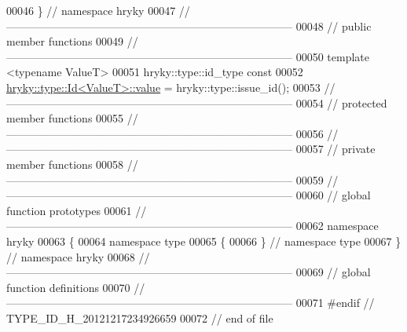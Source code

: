 \begin{DoxyCode}
00046 \} \textcolor{comment}{// namespace hryky}
00047 \textcolor{comment}{//
      ------------------------------------------------------------------------------}
00048 \textcolor{comment}{// public member functions}
00049 \textcolor{comment}{//
      ------------------------------------------------------------------------------}
00050 \textcolor{keyword}{template} <\textcolor{keyword}{typename} ValueT>
00051 hryky::type::id\_type \textcolor{keyword}{const}
00052 \hyperlink{classhryky_1_1type_1_1_id}{hryky::type::Id<ValueT>::value} = hryky::type::issue\_id();
00053 \textcolor{comment}{//
      ------------------------------------------------------------------------------}
00054 \textcolor{comment}{// protected member functions}
00055 \textcolor{comment}{//
      ------------------------------------------------------------------------------}
00056 \textcolor{comment}{//
      ------------------------------------------------------------------------------}
00057 \textcolor{comment}{// private member functions}
00058 \textcolor{comment}{//
      ------------------------------------------------------------------------------}
00059 \textcolor{comment}{//
      ------------------------------------------------------------------------------}
00060 \textcolor{comment}{// global function prototypes}
00061 \textcolor{comment}{//
      ------------------------------------------------------------------------------}
00062 \textcolor{keyword}{namespace }hryky
00063 \{
00064 \textcolor{keyword}{namespace }type
00065 \{
00066 \} \textcolor{comment}{// namespace type}
00067 \} \textcolor{comment}{// namespace hryky}
00068 \textcolor{comment}{//
      ------------------------------------------------------------------------------}
00069 \textcolor{comment}{// global function definitions}
00070 \textcolor{comment}{//
      ------------------------------------------------------------------------------}
00071 \textcolor{preprocessor}{#endif // TYPE\_ID\_H\_20121217234926659}
00072 \textcolor{preprocessor}{}\textcolor{comment}{// end of file}
\end{DoxyCode}
